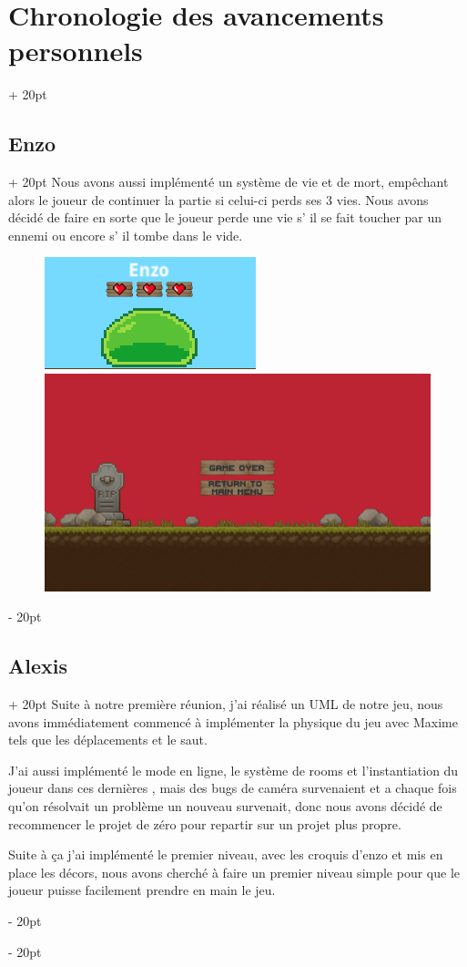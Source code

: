 \documentclass[a4paper, 12pt, twoside]{article}
\newcommand{\ind}[1][20pt]{\advance\leftskip + #1}
\newcommand{\deind}[1][20pt]{\advance\leftskip - #1}
\newenvironment{indt}[2][20pt]{#2 \par \ind[#1]}{\par \deind} %
\begin{document}
\begin{indt}{\section{Chronologie des avancements personnels}}
\begin{indt}{\subsection{Enzo}}
            Nous avons aussi implémenté un système de vie et de mort, empêchant alors le joueur de continuer la partie si celui-ci perds ses 3 vies. Nous avons décidé de faire en sorte que le joueur perde une vie s' il se fait toucher par un ennemi ou encore s' il tombe dans le vide.

            \begin{figure}
                \includegraphics[width=0.49\linewidth]{Slime1.png}\hfill \hfill\includegraphics[width=0.49\linewidth]{GameOver.png}
            \end{figure}
        \end{indt}

        \begin{indt}{\subsection{Alexis}}
            Suite à notre première réunion, j'ai réalisé un UML de notre jeu, nous avons immédiatement commencé à implémenter la physique du jeu avec Maxime tels que les déplacements et le saut.

            J'ai aussi implémenté le mode en ligne, le système de rooms et l'instantiation du joueur dans ces dernières , mais des bugs de caméra survenaient et a chaque fois qu'on résolvait un problème un nouveau survenait, donc nous avons décidé de recommencer le projet de zéro pour repartir sur un projet plus propre.

            Suite à ça j'ai implémenté le premier niveau, avec les croquis d'enzo et mis en place les décors, nous avons cherché à faire un premier niveau simple pour que le joueur puisse facilement prendre en main le jeu.


\end{indt}
\end{indt}
\end{document}
